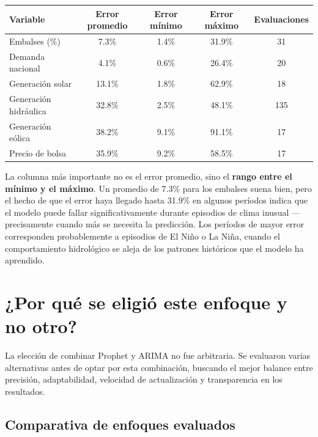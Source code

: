 \documentclass[11pt,a4paper]{article}
\newcommand{\REALMAPEEMBAVG}{7.3\%}
\newcommand{\REALMAPEEMBMIN}{1.4\%}
\newcommand{\REALMAPEEMBMAX}{31.9\%}
\newcommand{\REALMAPEHID}{32.8\%}
\newcommand{\REALMAPEDEM}{4.1\%}
\newcommand{\REALMAPESOL}{13.1\%}
\newcommand{\REALMAPEEOL}{38.2\%}
\newcommand{\REALMAPEPRE}{35.9\%}
\begin{document}
\begin{center}
\small
\begin{tabular}{@{}lcccc@{}}
\toprule
\textbf{Variable} & \textbf{Error promedio} & \textbf{Error mínimo} & \textbf{Error máximo} & \textbf{Evaluaciones} \\
\midrule
Embalses (\%) & \REALMAPEEMBAVG & \REALMAPEEMBMIN & \REALMAPEEMBMAX & 31 \\
Demanda nacional & \REALMAPEDEM & 0.6\% & 26.4\% & 20 \\
Generación solar & \REALMAPESOL & 1.8\% & 62.9\% & 18 \\
Generación hidráulica & \REALMAPEHID & 2.5\% & 48.1\% & 135 \\
Generación eólica & \REALMAPEEOL & 9.1\% & 91.1\% & 17 \\
Precio de bolsa & \REALMAPEPRE & 9.2\% & 58.5\% & 17 \\
\bottomrule
\end{tabular}
\end{center}

\vspace{2mm}

\begin{highlightbox}
La columna más importante no es el error promedio, sino el \textbf{rango entre el mínimo y el máximo}. Un promedio de 7.3\% para los embalses suena bien, pero el hecho de que el error haya llegado hasta 31.9\% en algunos períodos indica que el modelo puede fallar significativamente durante episodios de clima inusual —precisamente cuando más se necesita la predicción. Los períodos de mayor error corresponden probablemente a episodios de El Niño o La Niña, cuando el comportamiento hidrológico se aleja de los patrones históricos que el modelo ha aprendido.
\end{highlightbox}

\section{¿Por qué se eligió este enfoque y no otro?}

La elección de combinar Prophet y ARIMA no fue arbitraria. Se evaluaron varias alternativas antes de optar por esta combinación, buscando el mejor balance entre precisión, adaptabilidad, velocidad de actualización y transparencia en los resultados.

\subsection{Comparativa de enfoques evaluados}
\end{document}
